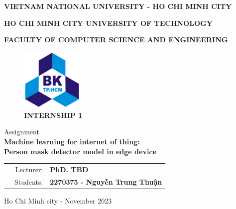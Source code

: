 
\begin{titlepage}
\centerline{\bf \normalsize VIETNAM NATIONAL UNIVERSITY - HO CHI MINH CITY}
\centerline{\bf \normalsize HO CHI MINH CITY UNIVERSITY OF TECHNOLOGY}
\centerline{\bf \normalsize FACULTY OF COMPUTER SCIENCE AND ENGINEERING}
\vspace*{1cm}
\begin{figure}[h!]
	\begin{center}
		\includegraphics[width=3cm]{image/bku.png}
		\\
		\vspace{.5cm}
		\LARGE \textbf{INTERNSHIP 1}
	\end{center}
\end{figure}

\begin{center}
    \Large Assignment
    \\
    \LARGE \textbf{Machine learning for internet of thing:\\Person mask detector model in edge device} \\
\end{center}

\vspace{3em}

\begin{table}[h]
\begin{tabular}{rrl}
\hspace{2.5 cm} & Lecturer: & \bf PhD. TBD\\
& Students:  & \bf 2270375 - Nguyễn Trung Thuận\\
\end{tabular}
\end{table}

\vspace{2.5em}

\vfill
\begin{center}
	{\normalsize Ho Chi Minh city - November 2023}
\end{center}
\end{titlepage}


\newpage

\thispagestyle{empty}